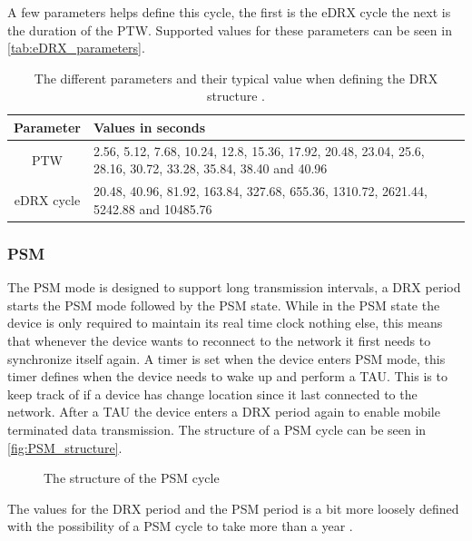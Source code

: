 A few parameters helps define this cycle, the first is the eDRX cycle the next is the duration of the \gls{PTW}. Supported values for these parameters can be seen in \autoref{tab:eDRX_parameters}.

\begin{table}[H]
\centering
\begin{tabular}{|c|p{8cm}|} \hline
\textbf{Parameter} & \textbf{Values in seconds} \\ \hline 
PTW & 2.56, 5.12, 7.68, 10.24, 12.8, 15.36, 17.92, 20.48, 23.04, 25.6, 28.16, 30.72, 33.28, 35.84, 38.40 and 40.96\\ \hline
eDRX cycle & 20.48, 40.96, 81.92, 163.84, 327.68, 655.36, 1310.72, 2621.44, 5242.88 and 10485.76 \\ \hline
\end{tabular}
\caption{The different parameters and their typical value when defining the DRX structure \citep{book_LTE_for_UMTS}.}
\label{tab:eDRX_parameters}
\end{table}

\subsubsection{PSM}
The PSM mode is designed to support long transmission intervals, a DRX period starts the PSM mode followed by the PSM state. While in the PSM state the device is only required to maintain its real time clock nothing else, this means that whenever the device wants to reconnect to the network it first needs to synchronize itself again. A timer is set when the device enters PSM mode, this timer defines when the device needs to wake up and perform a \gls{TAU}. This is to keep track of if a device has change location since it last connected to the network. After a TAU the device enters a DRX period again to enable mobile terminated data transmission. The structure of a PSM cycle can be seen in \autoref{fig:PSM_structure}.

\begin{figure}[H]
\centering
\resizebox{\textwidth}{!}{
}
\caption{The structure of the \gls{PSM} cycle}
\label{fig:PSM_structure}
\end{figure}

The values for the DRX period and the PSM period is a bit more loosely defined with the possibility of a PSM cycle to take more than a year \citep{NB-IoT_Book}.




